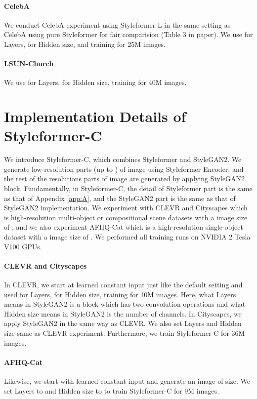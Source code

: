 \documentclass[10pt,twocolumn,letterpaper]{article}
\begin{document}
\paragraph{CelebA}
We conduct CelebA experiment using Styleformer-L in the same setting as CelebA using pure Styleformer for fair comparision (Table 3 in paper). We use  for Layers,  for Hidden size, and training for 25M images.


\paragraph{LSUN-Church} 
We use  for Layers,  for Hidden size, training for 40M images.


\section{Implementation Details of Styleformer-C}
\label{app:F}
We introduce Styleformer-C, which combines Styleformer and StyleGAN2. We generate low-resolution parts (up to ) of image using Styleformer Encoder, and the rest of the resolutions parts of image are generated by applying StyleGAN2 block. Fundamentally, in Styleformer-C, the detail of Styleformer part is the same as that of Appendix \ref{app:A}, and the StyleGAN2 part is the same as that of StyleGAN2 \cite{karras2020analyzing} implementation. We experiment with CLEVR and Cityscapes which is high-resolution multi-object or compositional scene datasets with a image size of , and we also experiment AFHQ-Cat which is a high-resolution single-object dataset with a image size of . We performed all training runs on NVIDIA 2 Tesla V100 GPUs.

\paragraph{CLEVR and Cityscapes}
In CLEVR, we start at  learned constant input just like the default setting and used  for Layers,  for Hidden size, training for 10M images. Here, what Layers means in StyleGAN2 is a block which has two convolution operations and what Hidden size means in StyleGAN2 is the number of channels. In Cityscapes, we apply StyleGAN2 in the same way as CLEVR. We also set Layers and Hidden size same as CLEVR experiment. Furthermore, we train Styleformer-C for 36M images.

\paragraph{AFHQ-Cat}
Likewise, we start with  learned constant input and generate an image of  size. We set Layers to  and Hidden size to  to train Styleformer-C for 9M images. 
\end{document}
